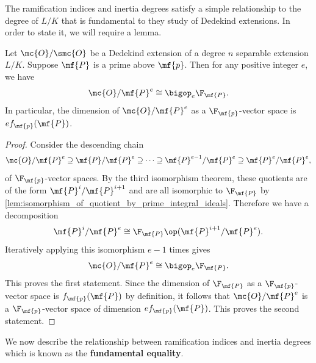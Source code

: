     The ramification indices and inertia degrees satisfy a simple relationship to the degree of \(L/K\) that is fundamental to they study of Dedekind extensions. In order to state it, we will require a lemma.

    \begin{lemma}\label{lem:quotient_by_prime_power_isomorphism}
      Let \(\mc{O}/\smc{O}\) be a Dedekind extension of a degree \(n\) separable extension \(L/K\). Suppose \(\mf{P}\) is a prime above \(\mf{p}\). Then for any positive integer \(e\), we have
      \[
        \mc{O}/\mf{P}^{e} \cong \bigop_{e}\F_{\mf{P}}.
      \]
      In particular, the dimension of \(\mc{O}/\mf{P}^{e}\) as a \(\F_{\mf{p}}\)-vector space is \(ef_{\mf{p}}(\mf{P})\).
    \end{lemma}
    \begin{proof}
      Consider the descending chain
      \[
        \mc{O}/\mf{P}^{e} \supseteq \mf{P}/\mf{P}^{e} \supseteq \cdots \supseteq \mf{P}^{e-1}/\mf{P}^{e} \supseteq \mf{P}^{e}/\mf{P}^{e},
      \]
      of \(\F_{\mf{p}}\)-vector spaces. By the third isomorphism theorem, these quotients are of the form \(\mf{P}^{i}/\mf{P}^{i+1}\) and are all isomorphic to \(\F_{\mf{P}}\) by \cref{lem:isomorphism_of_quotient_by_prime_integral_ideals}. Therefore we have a decomposition
      \[
        \mf{P}^{i}/\mf{P}^{e} \cong \F_{\mf{P}} \op (\mf{P}^{i+1}/\mf{P}^{e}).
      \]
      Iteratively applying this isomorphism \(e-1\) times gives
      \[
        \mc{O}/\mf{P}^{e} \cong \bigop_{e}\F_{\mf{P}}.
      \]
      This proves the first statement. Since the dimension of \(\F_{\mf{P}}\) as a \(\F_{\mf{p}}\)-vector space is \(f_{\mf{p}}(\mf{P})\) by definition, it follows that \(\mc{O}/\mf{P}^{e}\) is a \(\F_{\mf{p}}\)-vector space of dimension \(ef_{\mf{p}}(\mf{P})\). This proves the second statement.
    \end{proof}
    
    We now describe the relationship between ramification indices and inertia degrees which is known as the \textbf{fundamental equality}.

